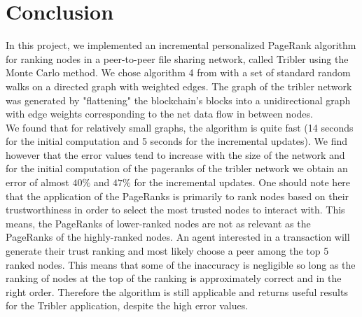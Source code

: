 \documentclass[twocolumn]{article}
\theoremstyle{definition}
\theoremstyle{theorem}
\begin{document}
\section{Conclusion}
\label{sec:Conclusion}
In this project, we implemented an incremental personalized PageRank algorithm for ranking nodes in a peer-to-peer file sharing network, called Tribler using the Monte Carlo method. We chose algorithm 4 from \cite{Monte Carlo methods in PageRank computation: When one iteration is sufficient} with a set of standard random walks on a directed graph with weighted edges. The graph of the tribler network was generated by "flattening" the blockchain's blocks into a unidirectional graph with edge weights corresponding to the net data flow in between nodes.\vspace{1em}\\

\noindent We found that for relatively small graphs, the algorithm is quite fast (14 seconds for the initial computation and 5 seconds for the incremental updates). We find however that the error values tend to increase with the size of the network and for the initial computation of the pageranks of the tribler network we obtain an error of almost $40\%$ and $47\%$ for the incremental updates. One should note here that the application of the PageRanks is primarily to rank nodes based on their trustworthiness in order to select the most trusted nodes to interact with. This means, the PageRanks of lower-ranked nodes are not as relevant as the PageRanks of the highly-ranked nodes. An agent interested in a transaction will generate their trust ranking and most likely choose a peer among the top 5 ranked nodes. This means that some of the inaccuracy is negligible so long as the ranking of nodes at the top of the ranking is approximately correct and in the right order. Therefore the algorithm is still applicable and returns useful results for the Tribler application, despite the high error values. \vspace{1em}\\
\end{document}
